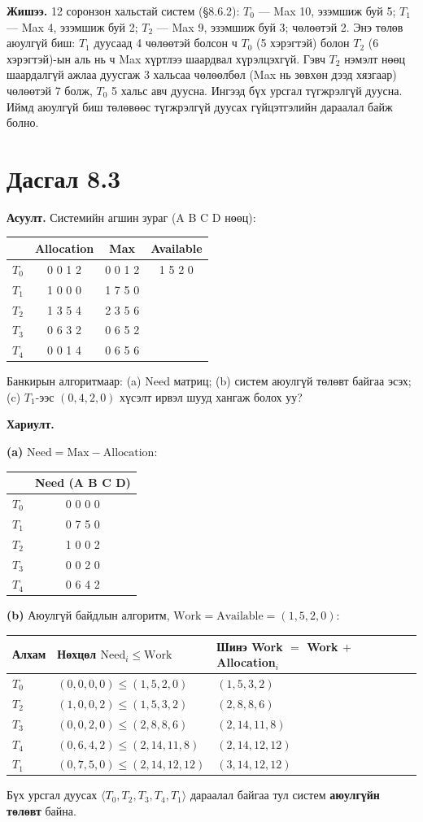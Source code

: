 \documentclass[12pt,a4paper]{article}
\newcommand{\question}[2]{\section{Дасгал #1}\textbf{Асуулт.} #2\par\medskip\textbf{Хариулт.}\par}
\begin{document}
\textbf{Жишээ.} 12 соронзон хальстай систем (§8.6.2): $T_0$ — Max 10, эзэмшиж буй 5; $T_1$ — Max 4, эзэмшиж буй 2; $T_2$ — Max 9, эзэмшиж буй 3; чөлөөтэй 2. Энэ төлөв аюулгүй биш: $T_1$ дуусаад 4 чөлөөтэй болсон ч $T_0$ (5 хэрэгтэй) болон $T_2$ (6 хэрэгтэй)-ын аль нь ч Max хүртлээ шаардвал хүрэлцэхгүй. Гэвч $T_2$ нэмэлт нөөц шаардалгүй ажлаа дуусгаж 3 хальсаа чөлөөлбөл (Max нь зөвхөн дээд хязгаар) чөлөөтэй 7 болж, $T_0$ 5 хальс авч дуусна. Ингээд бүх урсгал түгжрэлгүй дуусна. Иймд аюулгүй биш төлөвөөс түгжрэлгүй дуусах гүйцэтгэлийн дараалал байж болно.

\question{8.3}{Системийн агшин зураг (A B C D нөөц):
\begin{center}
\begin{tabular}{lccc}
\toprule
 & Allocation & Max & Available\\
\midrule
$T_0$ & 0 0 1 2 & 0 0 1 2 & 1 5 2 0\\
$T_1$ & 1 0 0 0 & 1 7 5 0 & \\
$T_2$ & 1 3 5 4 & 2 3 5 6 & \\
$T_3$ & 0 6 3 2 & 0 6 5 2 & \\
$T_4$ & 0 0 1 4 & 0 6 5 6 & \\
\bottomrule
\end{tabular}
\end{center}
Банкирын алгоритмаар: (a) Need матриц; (b) систем аюулгүй төлөвт байгаа эсэх; (c) $T_1$-ээс $(0,4,2,0)$ хүсэлт ирвэл шууд хангаж болох уу?}

\textbf{(a)} $\text{Need} = \text{Max} - \text{Allocation}$:
\begin{center}
\begin{tabular}{lc}
\toprule
 & Need (A B C D)\\
\midrule
$T_0$ & 0 0 0 0\\
$T_1$ & 0 7 5 0\\
$T_2$ & 1 0 0 2\\
$T_3$ & 0 0 2 0\\
$T_4$ & 0 6 4 2\\
\bottomrule
\end{tabular}
\end{center}

\textbf{(b)} Аюулгүй байдлын алгоритм, $\text{Work} = \text{Available} = (1,5,2,0)$:
\begin{center}
\begin{tabular}{lll}
\toprule
Алхам & Нөхцөл $\text{Need}_i \le \text{Work}$ & Шинэ Work $=$ Work $+$ Allocation$_i$\\
\midrule
$T_0$ & $(0,0,0,0) \le (1,5,2,0)$ & $(1,5,3,2)$\\
$T_2$ & $(1,0,0,2) \le (1,5,3,2)$ & $(2,8,8,6)$\\
$T_3$ & $(0,0,2,0) \le (2,8,8,6)$ & $(2,14,11,8)$\\
$T_4$ & $(0,6,4,2) \le (2,14,11,8)$ & $(2,14,12,12)$\\
$T_1$ & $(0,7,5,0) \le (2,14,12,12)$ & $(3,14,12,12)$\\
\bottomrule
\end{tabular}
\end{center}
Бүх урсгал дуусах $\langle T_0, T_2, T_3, T_4, T_1\rangle$ дараалал байгаа тул систем \textbf{аюулгүйн төлөвт} байна.
\end{document}

